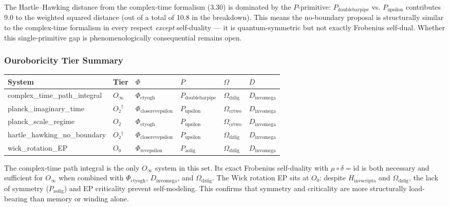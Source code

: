 \documentclass[12pt,a4paper]{article}
\begin{document}
The Hartle--Hawking distance from the complex-time formalism (3.30) is dominated by the $P$-primitive: $P_{\text{doublebarpipe}}$ vs. $P_{\text{upsilon}}$ contributes 9.0 to the weighted squared distance (out of a total of 10.8 in the breakdown). This means the no-boundary proposal is structurally similar to the complex-time formalism in every respect \emph{except} self-duality --- it is quantum-symmetric but not exactly Frobenius self-dual. Whether this single-primitive gap is phenomenologically consequential remains open.

\subsubsection{Ouroboricity Tier Summary}

\begin{table}[htbp]
\centering
\small
{}
\begin{tabularx}{\textwidth}{>{\centering\arraybackslash}X >{\centering\arraybackslash}X >{\centering\arraybackslash}X >{\centering\arraybackslash}X >{\centering\arraybackslash}X >{\centering\arraybackslash}X}
\toprule
\rowcolor{gray!25}\textbf{System} & \textbf{Tier} & \textbf{$\Phi$} & \textbf{$P$} & \textbf{$\Omega$} & \textbf{$D$} \\
\midrule
\rowcolors{1}{white}{gray!10}
complex\_time\_path\_integral & $O_{\infty}$ & $\Phi_{\text{ctyogh}}$ & $P_{\text{doublebarpipe}}$ & $\Omega_{\text{dzlig}}$ & $D_{\text{invomega}}$ \\
planck\_imaginary\_time & $O₂^\dagger$ & $\Phi_{\text{closerevepsilon}}$ & $P_{\text{upsilon}}$ & $\Omega_{\text{crtwo}}$ & $D_{\text{invomega}}$ \\
planck\_scale\_regime & $O₂$ & $\Phi_{\text{ctyogh}}$ & $P_{\text{upsilon}}$ & $\Omega_{\text{crtwo}}$ & $D_{\text{invomega}}$ \\
hartle\_hawking\_no\_boundary & $O₂^\dagger$ & $\Phi_{\text{closerevepsilon}}$ & $P_{\text{upsilon}}$ & $\Omega_{\text{dzlig}}$ & $D_{\text{invomega}}$ \\
wick\_rotation\_EP & $O₀$ & $\Phi_{\text{revepsilon}}$ & $P_{\text{aolig}}$ & $\Omega_{\text{dzlig}}$ & $D_{\text{invomega}}$ \\
\bottomrule
\end{tabularx}
\end{table}

The complex-time path integral is the only $O_{\infty}$ system in this set. Its exact Frobenius self-duality with $\mu \circ \delta = \text{id}$ is both necessary and sufficient for $O_{\infty}$ when combined with $\Phi_{\text{ctyogh}}$, $D_{\text{invomega}}$, and $\Omega_{\text{dzlig}}$. The Wick rotation EP sits at $O₀$: despite $H_{\text{invscripta}}$ and $\Omega_{\text{dzlig}}$, the lack of symmetry ($P_{\text{aolig}}$) and EP criticality prevent self-modeling. This confirms that symmetry and criticality are more structurally load-bearing than memory or winding alone.
\end{document}
